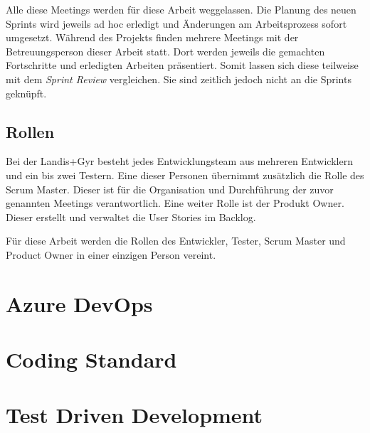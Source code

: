 Alle diese Meetings werden für diese Arbeit weggelassen.
Die Planung des neuen Sprints wird jeweils ad hoc erledigt und Änderungen am Arbeitsprozess sofort umgesetzt.
Während des Projekts finden mehrere Meetings mit der Betreuungsperson dieser Arbeit statt.
Dort werden jeweils die gemachten Fortschritte und erledigten Arbeiten präsentiert.
Somit lassen sich diese teilweise mit dem \textit{Sprint Review} vergleichen.
Sie sind zeitlich jedoch nicht an die Sprints geknüpft.

\subsection{Rollen}
Bei der Landis+Gyr besteht jedes Entwicklungsteam aus mehreren Entwicklern und ein bis zwei Testern.
Eine dieser Personen übernimmt zusätzlich die Rolle des Scrum Master.
Dieser ist für die Organisation und Durchführung der zuvor genannten Meetings verantwortlich.
Eine weiter Rolle ist der Produkt Owner.
Dieser erstellt und verwaltet die User Stories im Backlog.

Für diese Arbeit werden die Rollen des Entwickler, Tester, Scrum Master und Product Owner in einer einzigen Person vereint.


\section{Azure DevOps}\label{methoden:ADO}

\section{Coding Standard}

\section{Test Driven Development} \label{tdd}